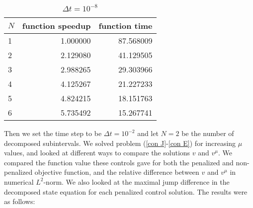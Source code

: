 \begin{table}[!h]
\centering
\caption{$\Delta t=10^{-8}$}
\begin{tabular}{lrr}
\toprule
{} $N$&  function speedup &      function time \\
\midrule
1 &  1.000000 &  87.568009 \\
2 &  2.129080 &  41.129505 \\
3 &  2.988265 &  29.303966 \\
4 &  4.125267 &  21.227233 \\
5 &  4.824215 &  18.151763 \\
6 &  5.735492 &  15.267741 \\
\bottomrule
\end{tabular}
\end{table}
Then we set the time step to be $\Delta t = 10^{-2}$ and let $N=2$ be the number of decomposed subintervals. We solved problem (\ref{con J}-\ref{con E}) for increasing $\mu$ values, and looked at different ways to compare the solutions $v$ and $v^{\mu}$. We compared the function value these controls gave for both the penalized and non-penalized objective function, and the relative difference between $v$ and $v^{\mu}$ in numerical $L^2$-norm. We also looked at the maximal jump difference in the decomposed state equation for each penalized control solution. The results were as follows:
\\
